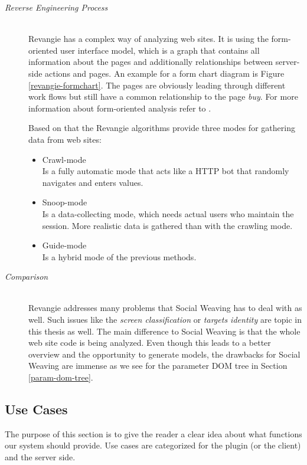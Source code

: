 \begin{enumerate}[A.]
	\begin{description}
		\item[\emph{Reverse Engineering Process}]\mbox{}\\ 
		Revangie has a complex way of analyzing web sites. It is using the form-oriented user interface model, which is a graph that contains all information about the pages and additionally relationships between server-side actions and pages. An example for a form chart diagram is Figure \ref{revangie-formchart}. The pages are obviously leading through different work flows but still have a common relationship to the page \emph{buy}. For more information about form-oriented analysis refer to \cite{draheim2005form}. 
		
		Based on that the Revangie algorithms provide three modes for gathering data from web sites:
		\begin{itemize}
			\item Crawl-mode\\
				Is a fully automatic mode that acts like a HTTP bot that randomly navigates and enters values.
			\item Snoop-mode\\
				Is a data-collecting mode, which needs actual users who maintain the session. More realistic data is gathered than with the crawling mode. 		
			\item Guide-mode\\
				Is a hybrid mode of the previous methods. 
		\end{itemize}
		
		\item[\emph{Comparison}]\mbox{}\\
		Revangie addresses many problems that Social Weaving has to deal with as well. Such issues like the \emph{screen classification} or \emph{targets identity} are topic in this thesis as well. The main difference to Social Weaving is that the whole web site code is being analyzed. Even though this leads to a better overview and the opportunity to generate models, the drawbacks for Social Weaving are immense as we see for the parameter DOM tree in Section \ref{param-dom-tree}.		
	\end{description}
\end{enumerate}

\newpage

\subsection{Use Cases}
The purpose of this section is to give the reader a clear idea about what functions our system should provide. Use cases are categorized for the plugin (or the client) and the server side. 

